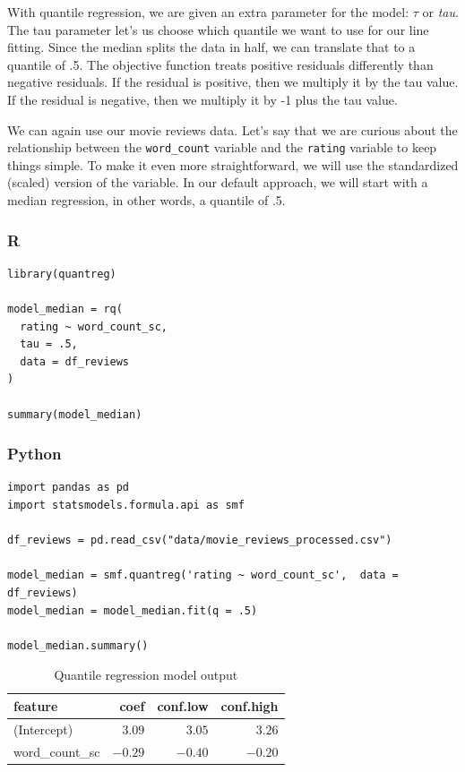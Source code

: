 \documentclass[
  letterpaper,
]{krantz}
\begin{document}
With quantile regression, we are given an extra parameter for the model:
\(\tau\) or \emph{tau}. The tau parameter let's us choose which quantile
we want to use for our line fitting. Since the median splits the data in
half, we can translate that to a quantile of .5. The objective function
treats positive residuals differently than negative residuals. If the
residual is positive, then we multiply it by the tau value. If the
residual is negative, then we multiply it by -1 plus the tau value.

We can again use our movie reviews data. Let's say that we are curious
about the relationship between the \texttt{word\_count} variable and the
\texttt{rating} variable to keep things simple. To make it even more
straightforward, we will use the standardized (scaled) version of the
variable. In our default approach, we will start with a median
regression, in other words, a quantile of .5.

\subsubsection{R}

\begin{verbatim}
library(quantreg)

model_median = rq(
  rating ~ word_count_sc, 
  tau = .5,
  data = df_reviews
)

summary(model_median)
\end{verbatim}

\subsubsection{Python}

\begin{verbatim}
import pandas as pd
import statsmodels.formula.api as smf

df_reviews = pd.read_csv("data/movie_reviews_processed.csv")

model_median = smf.quantreg('rating ~ word_count_sc',  data = df_reviews)
model_median = model_median.fit(q = .5)
                           
model_median.summary()                           
\end{verbatim}

\begin{longtable}{lrrr}

\caption{\label{tbl-quantile-model-output}Quantile regression model
output}

\tabularnewline

\toprule
feature & coef & conf.low & conf.high \\ 
\midrule\addlinespace[2.5pt]
(Intercept) & \textcolor[HTML]{404040}{$3.09$} & \textcolor[HTML]{404040}{$3.05$} & \textcolor[HTML]{404040}{$3.26$} \\ 
word\_count\_sc & \textcolor[HTML]{404040}{$-0.29$} & \textcolor[HTML]{404040}{$-0.40$} & \textcolor[HTML]{404040}{$-0.20$} \\ 
\bottomrule

\end{longtable}
\end{document}
